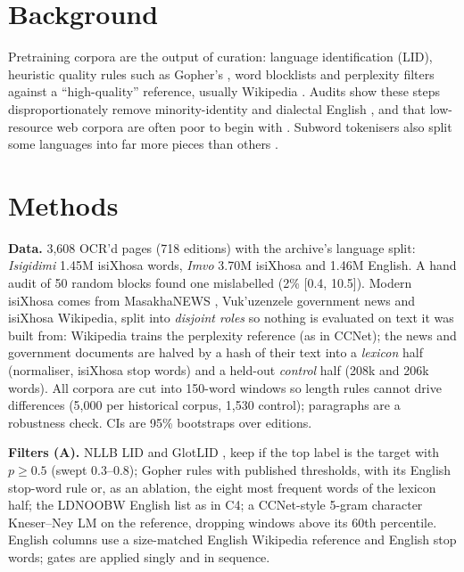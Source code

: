 \documentclass[10pt,letterpaper]{article}
\begin{document}
\section{Background}
Pretraining corpora are the output of curation: language identification (LID), heuristic quality rules such as Gopher's \citep{rae2021gopher}, word blocklists \citep{raffel2020c4} and perplexity filters against a ``high-quality'' reference, usually Wikipedia \citep{wenzek2020ccnet}. Audits show these steps disproportionately remove minority-identity and dialectal English \citep{dodge2021c4}, and that low-resource web corpora are often poor to begin with \citep{kreutzer2022quality}. Subword tokenisers also split some languages into far more pieces than others \citep{rust2021tokenizer,petrov2023unfairness}.

\section{Methods}
\textbf{Data.} 3{,}608 OCR'd pages (718 editions) with the archive's language split: \emph{Isigidimi} 1.45M isiXhosa words, \emph{Imvo} 3.70M isiXhosa and 1.46M English. A hand audit of 50 random blocks found one mislabelled (2\% [0.4, 10.5]). Modern isiXhosa comes from MasakhaNEWS \citep{adelani2023masakhanews}, Vuk'uzenzele government news \citep{lastrucci2023vukuzenzele} and isiXhosa Wikipedia, split into \emph{disjoint roles} so nothing is evaluated on text it was built from: Wikipedia trains the perplexity reference (as in CCNet); the news and government documents are halved by a hash of their text into a \emph{lexicon} half (normaliser, isiXhosa stop words) and a held-out \emph{control} half (208k and 206k words). All corpora are cut into 150-word windows so length rules cannot drive differences (5{,}000 per historical corpus, 1{,}530 control); paragraphs are a robustness check. CIs are 95\% bootstraps over editions.

\textbf{Filters (A).} NLLB LID \citep{nllb2022} and GlotLID \citep{kargaran2023glotlid}, keep if the top label is the target with $p\geq0.5$ (swept 0.3--0.8); Gopher rules with published thresholds, with its English stop-word rule or, as an ablation, the eight most frequent words of the lexicon half; the LDNOOBW English list as in C4; a CCNet-style 5-gram character Kneser--Ney LM on the reference, dropping windows above its 60th percentile. English columns use a size-matched English Wikipedia reference and English stop words; gates are applied singly and in sequence.
\end{document}
